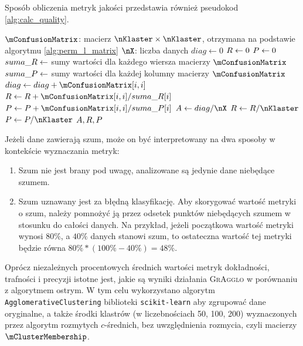 \documentclass[a4paper,twoside,12pt]{book}
\newcommand{\procedura}[1]{\textsc{#1}}
\newcommand{\MojAlg}{\procedura{GrAgglo}}
\begin{document}
Sposób obliczenia metryk jakości przedstawia również pseudokod \ref{alg:calc_quality}.

\begin{algorithm}[t]
	\caption{Wyznaczenie dokładności, trafności i precyzji}
	\label{alg:calc_quality}
	\begin{algorithmic}[1]
		\Require $\mConfusionMatrix$: macierz $\nKlaster \times \nKlaster$, otrzymana na podstawie algorytmu \ref{alg:perm_l_matrix}
		\Require $\nX$: liczba danych
		\State $diag \gets 0$ 
		\State $R \gets 0$
		\State $P \gets 0$
		\State $suma\_R \gets $ sumy wartości dla każdego wiersza macierzy $\mConfusionMatrix$
		\State $suma\_P \gets $ sumy wartości dla każdej kolumny macierzy $\mConfusionMatrix$
		\State $diag \gets diag + \mConfusionMatrix[i, i]$
			\State $\recall \gets \recall + \mConfusionMatrix[i, i] / suma\_\recall[i]$
		\EndIf
			\State $\precision \gets \precision + \mConfusionMatrix[i, i] / suma\_\precision[i]$
		\EndIf
		\EndFor
		\State $\accuracy \gets diag / \nX$
		\State $\recall \gets \recall / \nKlaster$
		\State $\precision \gets \precision / \nKlaster$
		\State \Return $A, R, P$
		\EndProcedure
	\end{algorithmic}
\end{algorithm}

Jeżeli dane zawierają szum, może on być interpretowany na dwa sposoby w kontekście wyznaczania metryk:

\begin{enumerate}
	\item Szum nie jest brany pod uwagę, analizowane są jedynie dane niebędące szumem.
	\item Szum uznawany jest za błędną klasyfikację. Aby skorygować wartość metryki o szum, należy pomnożyć ją przez odsetek punktów niebędących szumem w stosunku do całości danych. Na przykład, jeżeli początkowa wartość metryki wynosi $80\%$, a $40\%$ danych stanowi szum, to ostateczna wartość tej metryki będzie równa $80\% * (100\% - 40\%) = 48\%$.
\end{enumerate}

Oprócz niezależnych procentowych średnich wartości metryk dokładności, trafności i precyzji istotne jest, jakie są wyniki działania \MojAlg{} w porównaniu z algorytmem ostrym. W tym celu wykorzystano algorytm \texttt{Ag\-glo\-me\-ra\-ti\-ve\-Clu\-s\-te\-ring} biblioteki \texttt{scikit-learn} aby zgrupować dane oryginalne, a także środki klastrów (w liczebnościach 50, 100, 200) wyznaczonych przez algorytm rozmytych $c$-średnich, bez uwzględnienia rozmycia, czyli macierzy $\mClusterMembership$.
\end{document}
